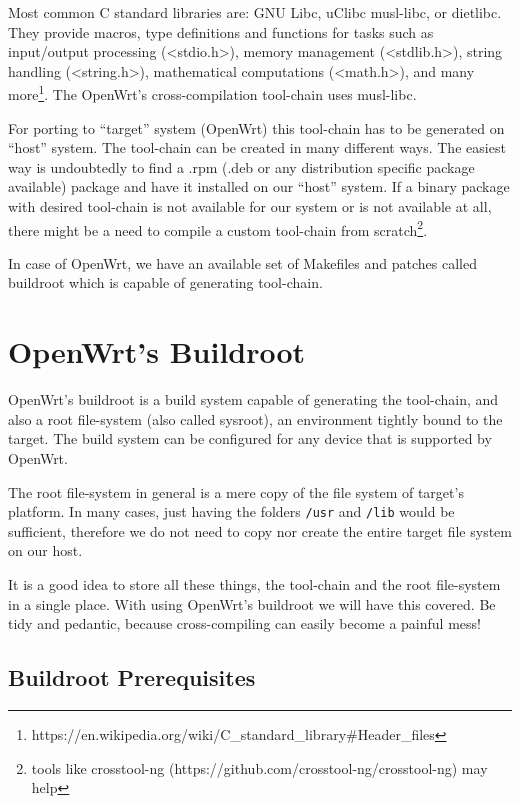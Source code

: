 Most common C standard libraries are: GNU Libc, uClibc musl-libc, or dietlibc.
They provide macros, type definitions and functions for tasks such as input/output processing (<stdio.h>), memory management (<stdlib.h>), string handling (<string.h>), mathematical computations (<math.h>), and many more\footnote{https://en.wikipedia.org/wiki/C\_standard\_library\#Header\_files}.
The OpenWrt's cross-compilation tool-chain uses musl-libc.

For porting to “target” system (OpenWrt) this tool-chain has to be generated on “host” system.
The tool-chain can be created in many different ways.
The easiest way is undoubtedly to find a .rpm (.deb or any distribution specific package available) package and have it installed on our “host” system.
If a binary package with desired tool-chain is not available for our system or is not available at all, there might be a need to compile a custom tool-chain from scratch\footnote{tools like crosstool-ng (https://github.com/crosstool-ng/crosstool-ng) may help}.

In case of OpenWrt, we have an available set of Makefiles and patches called buildroot which is capable of generating tool-chain.



\section{OpenWrt's Buildroot}

OpenWrt's buildroot is a build system capable of generating the tool-chain, and also a root file-system (also called sysroot), an environment tightly bound to the target.
The build system can be configured for any device that is supported by OpenWrt.

The root file-system in general is a mere copy of the file system of target's platform.
In many cases, just having the folders {\tt /usr} and {\tt /lib} would be sufficient, therefore we do not need to copy nor create the entire target file system on our host.

It is a good idea to store all these things, the tool-chain and the root file-system in a single place.
With using OpenWrt's buildroot we will have this covered.
Be tidy and pedantic, because cross-compiling can easily become a painful mess!\cite{fabrizio}



\subsection{Buildroot Prerequisites}

